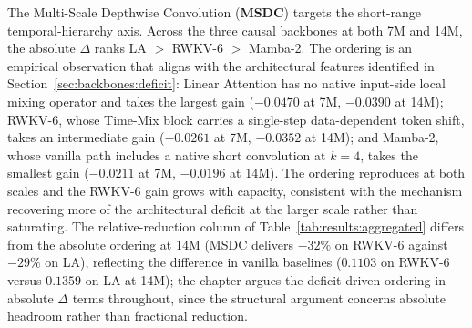 The Multi-Scale Depthwise Convolution (\textbf{MSDC}) targets
the short-range temporal-hierarchy axis. Across the three causal
backbones at both 7M and 14M, the absolute $\Delta$ ranks
LA $>$ RWKV-6 $>$ Mamba-2. The ordering is an empirical
observation that aligns with the architectural features
identified in Section~\ref{sec:backbones:deficit}: Linear
Attention has no native input-side local mixing operator and
takes the largest gain ($-0.0470$ at 7M, $-0.0390$ at 14M);
RWKV-6, whose Time-Mix block carries a single-step
data-dependent token shift, takes an intermediate gain
($-0.0261$ at 7M, $-0.0352$ at 14M); and Mamba-2, whose vanilla
path includes a native short convolution at $k = 4$, takes the
smallest gain ($-0.0211$ at 7M, $-0.0196$ at 14M). The ordering
reproduces at both scales and the RWKV-6 gain grows with
capacity, consistent with the mechanism recovering more of the
architectural deficit at the larger scale rather than
saturating. The relative-reduction column of
Table~\ref{tab:results:aggregated} differs from the absolute
ordering at 14M (MSDC delivers $-32\%$ on RWKV-6 against $-29\%$
on LA), reflecting the difference in vanilla baselines ($0.1103$
on RWKV-6 versus $0.1359$ on LA at 14M); the chapter argues the
deficit-driven ordering in absolute $\Delta$ terms throughout,
since the structural argument concerns absolute headroom rather
than fractional reduction.

